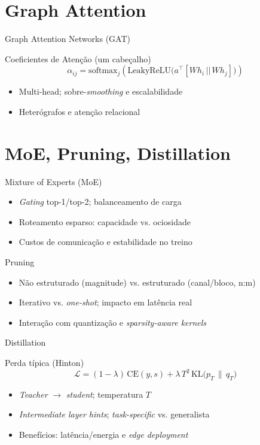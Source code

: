 \documentclass{beamer}
\begin{document}
\section{Graph Attention}
\begin{frame}{Graph Attention Networks (GAT)}
	\begin{block}{Coeficientes de Atenção (um cabeçalho)}
		\small
		\[
			\alpha_{ij}=\mathrm{softmax}_j\!\left(\mathrm{LeakyReLU}\!\big(a^\top[Wh_i \,||\, Wh_j]\big)\right)
		\]
	\end{block}
	\begin{itemize}
		\item Multi-head; sobre-\textit{smoothing} e escalabilidade
		\item Heterógrafos e atenção relacional
	\end{itemize}
\end{frame}



\section{MoE, Pruning, Distillation}
\begin{frame}{Mixture of Experts (MoE)}
	\begin{itemize}
		\item \textit{Gating} top-1/top-2; balanceamento de carga
		\item Roteamento esparso: capacidade vs. ociosidade
		\item Custos de comunicação e estabilidade no treino
	\end{itemize}
\end{frame}

\begin{frame}{Pruning}
	\begin{itemize}
		\item Não estruturado (magnitude) vs. estruturado (canal/bloco, n:m)
		\item Iterativo vs. \textit{one-shot}; impacto em latência real
		\item Interação com quantização e \textit{sparsity-aware kernels}
	\end{itemize}
\end{frame}

\begin{frame}{Distillation}
	\begin{block}{Perda típica (Hinton)}
		\small
		\[
			\mathcal{L}=(1-\lambda)\,\mathrm{CE}(y,s)+\lambda\,T^2\,\mathrm{KL}\!\big(p_T \,\|\, q_T\big)
		\]
	\end{block}
	\begin{itemize}
		\item \textit{Teacher} $\rightarrow$ \textit{student}; temperatura $T$
		\item \textit{Intermediate layer hints}; \textit{task-specific} vs. generalista
		\item Benefícios: latência/energia e \textit{edge deployment}
	\end{itemize}
\end{frame}
\end{document}
